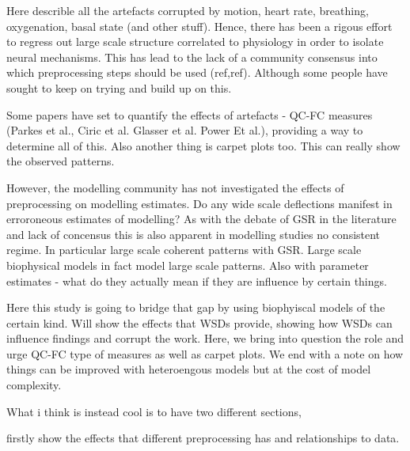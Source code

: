 \documentclass[oneside]{zHenriquesLab-StyleBioRxiv}
\begin{document}
Here describle all the artefacts corrupted by motion, heart rate, breathing, oxygenation, basal state (and other stuff). Hence, there has been a rigous effort to regress out large scale structure correlated to physiology in order to isolate neural mechanisms. This has lead to the lack of a community consensus into which preprocessing steps should be used (ref,ref). Although some people have sought to keep on trying and build up on this. 

Some papers have set to quantify the effects of artefacts - QC-FC measures (Parkes et al., Ciric et al. Glasser et al. Power Et al.), providing a way to determine all of this. Also another thing is carpet plots too. This can really show the observed patterns.

However, the modelling community has not investigated the effects of preprocessing on modelling estimates. Do any wide scale deflections manifest in erroroneous estimates of modelling? As with the debate of GSR in the literature and lack of concensus this is also apparent in modelling studies no consistent regime. In particular large scale coherent patterns with GSR. Large scale biophysical models in fact model large scale patterns. Also with parameter estimates - what do they actually mean if they are influence by certain things. 

Here this study is going to bridge that gap by using biophyiscal models of the certain kind. Will show the effects that WSDs provide, showing how WSDs can influence findings and corrupt the work. Here, we bring into question the role and urge QC-FC type of measures as well as carpet plots. We end with a note on how things can be improved with heteroengous models but at the cost of model complexity. 


What i think is instead cool is to have two different sections, 

firstly show the effects that different preprocessing has and relationships to data. 




\end{document}
